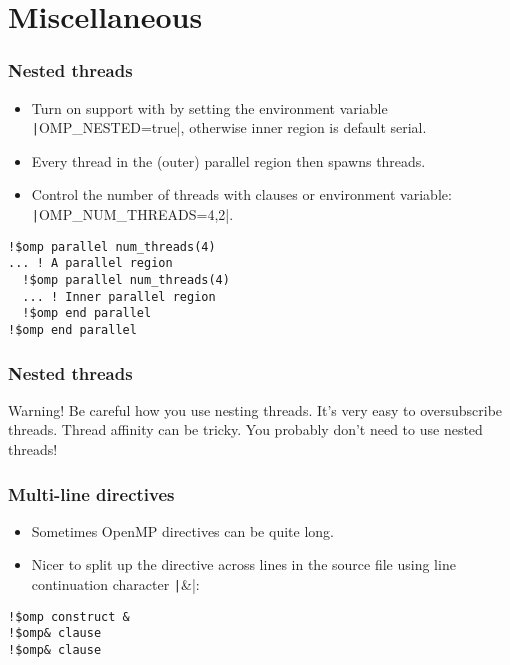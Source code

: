 \documentclass{beamer}
\begin{document}
\section{Miscellaneous}
\begin{frame}[fragile]
\frametitle{Nested threads}
\begin{itemize}
  \item Turn on support with by setting the environment variable \texttt|OMP_NESTED=true|, otherwise inner region is default serial.
  \item Every thread in the (outer) parallel region then spawns threads.
  \item Control the number of threads with clauses or environment variable: \texttt|OMP_NUM_THREADS=4,2|.
\end{itemize}

\begin{verbatim}
!$omp parallel num_threads(4)
... ! A parallel region
  !$omp parallel num_threads(4)
  ... ! Inner parallel region
  !$omp end parallel
!$omp end parallel
\end{verbatim}

\end{frame}


\begin{frame}
\frametitle{Nested threads}
\begin{alertblock}{Warning!}
Be careful how you use nesting threads.
It's very easy to oversubscribe threads.
Thread affinity can be tricky.
You probably don't need to use nested threads!
\end{alertblock}
\end{frame}

\begin{frame}[fragile]
\frametitle{Multi-line directives}
\begin{itemize}
  \item Sometimes OpenMP directives can be quite long.
  \item Nicer to split up the directive across lines in the source file using line continuation character \texttt|&|:
\end{itemize}

\begin{verbatim}
!$omp construct &
!$omp& clause
!$omp& clause
\end{verbatim}

\end{frame}
\end{document}
